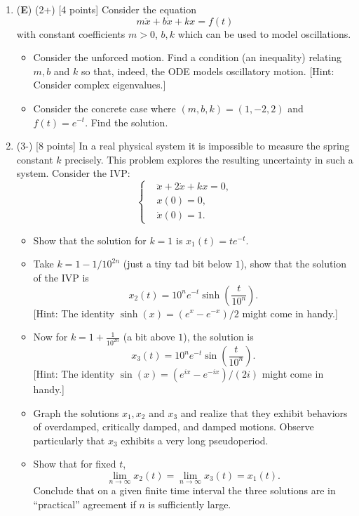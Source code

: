 \documentclass[12pt]{article}
\begin{document}
\begin{enumerate}
    \item (\textbf{E}) (2+) [4 points] Consider the equation
  \[
  m\ddot{x}+b\dot{x}+kx=f(t)
  \]
  with constant coefficients \(m>0\), \(b,k\) which can be used to model oscillations.
  \begin{itemize}
    \item Consider the unforced motion. Find a condition (an inequality) relating \(m,b\) and \(k\) so that, indeed, the ODE models oscillatory motion. [Hint: Consider complex eigenvalues.]
    \item Consider the concrete case where \((m,b,k)=(1,-2,2)\) and \(f(t)=e^{-t}\). Find the solution.
  \end{itemize}


  \item (3-) [8 points] In a real physical system it is impossible to measure the spring constant \(k\) precisely. This problem explores the resulting uncertainty in such a system. Consider the IVP:
  \[
  \left\lbrace
  \begin{aligned}
  &\ddot{x}+2\dot{x}+kx=0,\\
  &x(0)=0,\\
  &\dot{x}(0)=1.    
  \end{aligned}
  \right.
  \]
  \begin{itemize}
    \item Show that the solution for \(k=1\) is \(x_1(t)=te^{-t}\).
    \item Take \(k=1-1/10^{2n}\) (just a tiny tad bit below \(1\)), show that the solution of the IVP is 
    \[
    x_2(t)=10^ne^{-t}\sinh\left(\frac{t}{10^n}\right).
    \]
    [Hint: The identity \(\sinh(x)=(e^{x}-e^{-x})/2\) might come in handy.]
    \item Now for \(k=1+\frac{1}{10^{2n}}\) (a bit above \(1\)), the solution is 
    \[
    x_3(t)=10^ne^{-t}\sin\left(\frac{t}{10^n}\right).
    \]
    [Hint: The identity \(\sin(x)=(e^{ix}-e^{-ix})/(2i)\) might come in handy.]
    \item Graph the solutions \(x_1,x_2\) and \(x_3\) and realize that they exhibit behaviors of overdamped, critically damped, and damped motions. Observe particularly that \(x_3\) exhibits a very long pseudoperiod.
    \item Show that for fixed \(t\), 
    \[\lim_{n\to\infty}x_2(t)=\lim_{n\to\infty}x_3(t)=x_1(t).\]
    Conclude that on a given finite time interval the three solutions are in “practical” agreement if \(n\) is sufficiently large.
  \end{itemize}



\end{enumerate}
\end{document}
